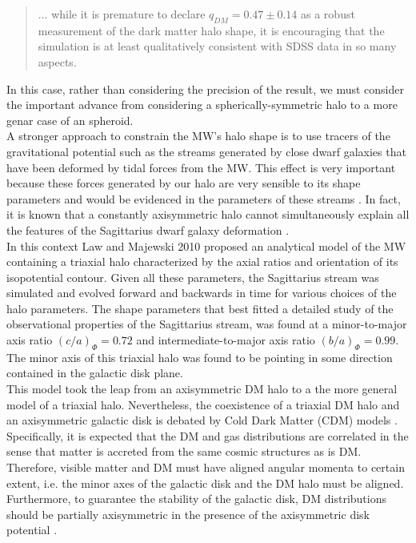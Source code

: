 \blockquote{... while it is premature to declare $q_{DM}=0.47 \pm 0.14$ as a robust measurement of the dark matter halo shape, it is encouraging that the simulation is at least qualitatively consistent with SDSS data in so many aspects.}

In this case, rather than considering the precision of the result, we must consider the important advance from considering a spherically-symmetric halo to a more genar case of an spheroid.\\

A stronger approach to constrain the MW's halo shape is to use tracers of the gravitational potential such as the streams generated by close dwarf galaxies that have been deformed by tidal forces from the MW. 
This effect is very important because these forces generated by our halo are very sensible to its shape parameters and would be evidenced in the parameters of these streams \cite{Law_and_Majewski_2009,Law_and_Majewski_2010,Deg_and_Lawrence_2013}. 
In fact, it is known that a constantly axisymmetric halo cannot simultaneously explain all the features of the Sagittarius dwarf galaxy deformation \cite{Law_and_Majewski_2009}. \\

In this context Law and Majewski 2010 proposed an analytical model of the MW containing a triaxial halo characterized by the axial ratios and orientation of its isopotential contour. 
Given all these parameters, the Sagittarius stream was simulated and evolved forward and backwards in time for various choices of the halo parameters. 
The shape parameters that best fitted a detailed study of the observational properties of the Sagittarius stream, was found at a minor-to-major axis ratio $(c/a)_{\Phi}=0.72$ and intermediate-to-major axis ratio $(b/a)_{\Phi}=0.99$. The minor axis of this triaxial halo was found to be pointing in some direction contained in the galactic disk plane. \\

This model took the leap from an axisymmetric DM halo to a the more general model of a triaxial halo.
Nevertheless, the coexistence of a triaxial DM halo and an axisymmetric galactic disk is debated by Cold Dark Matter (CDM) models \cite{Debattista_et_al._2008}. 
Specifically, it is expected that the DM and gas distributions are correlated in the sense that matter is accreted from the same cosmic structures as is DM. 
Therefore, visible matter and DM must have aligned angular momenta to certain extent, i.e. the minor axes of the galactic disk and the DM halo must be aligned. 
Furthermore, to guarantee the stability of the galactic disk, DM distributions should be partially axisymmetric in the presence of the axisymmetric disk potential \cite{Ostriker_and_Peebles_1973}.\\


